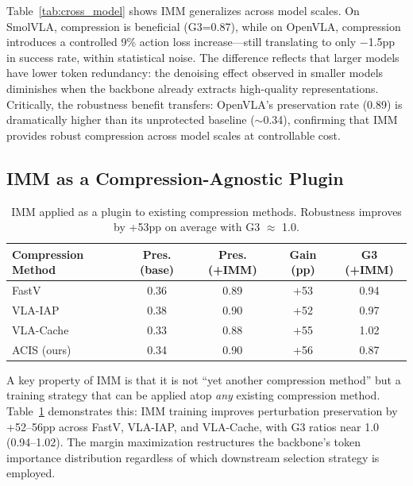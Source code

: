 \documentclass[conference]{corl_2026}
\newcommand{\ours}{IMM}
\begin{document}
Table~\ref{tab:cross_model} shows \ours{} generalizes across model scales. On SmolVLA, compression is beneficial (G3=0.87), while on OpenVLA, compression introduces a controlled 9\% action loss increase---still translating to only $-$1.5pp in success rate, within statistical noise.
The difference reflects that larger models have lower token redundancy: the denoising effect observed in smaller models diminishes when the backbone already extracts high-quality representations.
Critically, the robustness benefit transfers: OpenVLA's preservation rate (0.89) is dramatically higher than its unprotected baseline ($\sim$0.34), confirming that \ours{} provides robust compression across model scales at controllable cost.

\subsection{IMM as a Compression-Agnostic Plugin}
\label{sec:cross_compression}

\begin{table}[t]
\centering
\caption{IMM applied as a plugin to existing compression methods. Robustness improves by +53pp on average with G3 $\approx$ 1.0.}
\label{tab:plugin}
\small
\begin{tabular}{@{}lcccc@{}}
\toprule
Compression Method & Pres. (base) & Pres. (+IMM) & Gain (pp) & G3 (+IMM) \\
\midrule
FastV & 0.36 & 0.89 & +53 & 0.94 \\
VLA-IAP & 0.38 & 0.90 & +52 & 0.97 \\
VLA-Cache & 0.33 & 0.88 & +55 & 1.02 \\
ACIS (ours) & 0.34 & 0.90 & +56 & 0.87 \\
\bottomrule
\end{tabular}
\end{table}

A key property of \ours{} is that it is not ``yet another compression method'' but a training strategy that can be applied atop \emph{any} existing compression method. Table~\ref{tab:plugin} demonstrates this: \ours{} training improves perturbation preservation by +52--56pp across FastV, VLA-IAP, and VLA-Cache, with G3 ratios near 1.0 (0.94--1.02). The margin maximization restructures the backbone's token importance distribution regardless of which downstream selection strategy is employed.
\end{document}
